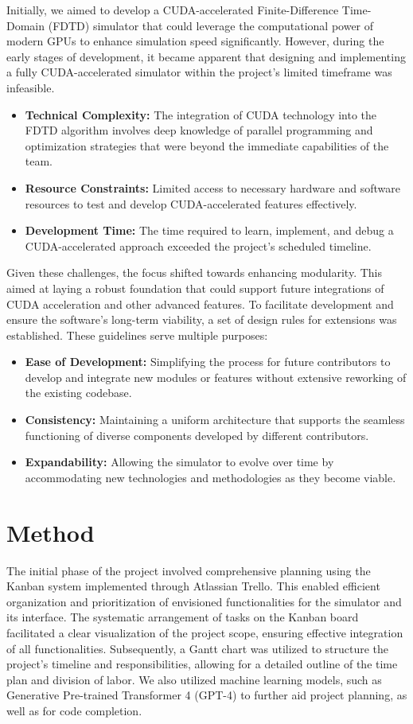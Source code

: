 \documentclass[11pt, a4paper, titlepage]{article}
\begin{document}
Initially, we aimed to develop a CUDA-accelerated Finite-Difference Time-Domain (FDTD) simulator that could leverage the computational power of modern GPUs to enhance simulation speed significantly.
However, during the early stages of development, it became apparent that designing and implementing a fully CUDA-accelerated simulator within the project's limited timeframe was infeasible.
\begin{itemize}
	\item \textbf{Technical Complexity:} The integration of CUDA technology into the FDTD algorithm involves deep knowledge of parallel programming and optimization strategies that were beyond the immediate capabilities of the team.
	\item \textbf{Resource Constraints:} Limited access to necessary hardware and software resources to test and develop CUDA-accelerated features effectively.
	\item \textbf{Development Time:} The time required to learn, implement, and debug a CUDA-accelerated approach exceeded the project's scheduled timeline.
\end{itemize}

Given these challenges, the focus shifted towards enhancing modularity. This aimed at laying a robust foundation that could support future integrations of CUDA acceleration and other advanced features.
To facilitate development and ensure the software's long-term viability, a set of design rules for extensions was established. These guidelines serve multiple purposes:
\begin{itemize}
	\item \textbf{Ease of Development:} Simplifying the process for future contributors to develop and integrate new modules or features without extensive reworking of the existing codebase.
	\item \textbf{Consistency:} Maintaining a uniform architecture that supports the seamless functioning of diverse components developed by different contributors.
	\item \textbf{Expandability:} Allowing the simulator to evolve over time by accommodating new technologies and methodologies as they become viable.
\end{itemize}

\section{Method}
The initial phase of the project involved comprehensive planning using the Kanban system implemented through Atlassian Trello. This enabled efficient organization and prioritization of envisioned functionalities for the simulator and its interface. The systematic arrangement of tasks on the Kanban board facilitated a clear visualization of the project scope, ensuring effective integration of all functionalities. Subsequently, a Gantt chart was utilized to structure the project's timeline and responsibilities, allowing for a detailed outline of the time plan and division of labor. We also utilized machine learning models, such as Generative Pre-trained Transformer 4 (GPT-4)\cite{openai23} to further aid project planning, as well as for code completion.
\end{document}
